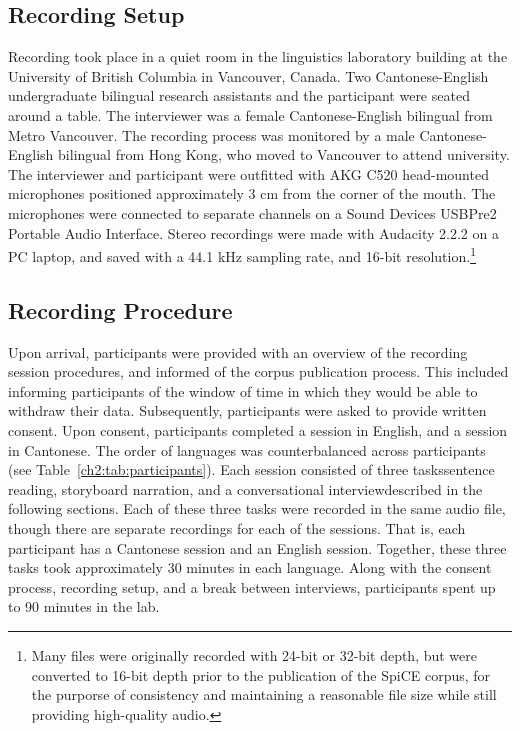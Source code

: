 \subsection{Recording Setup}\label{ch2:subsec:setup}
Recording took place in a quiet room in the linguistics laboratory building at the University of British Columbia in Vancouver, Canada. Two Cantonese-English undergraduate bilingual research assistants and the participant were seated around a table. The interviewer was a female Cantonese-English bilingual from Metro Vancouver. The recording process was monitored by a male Cantonese-English bilingual from Hong Kong, who moved to Vancouver to attend university. The interviewer and participant were outfitted with AKG C520 head-mounted microphones positioned approximately 3 cm from the corner of the mouth. The microphones were connected to separate channels on a Sound Devices USBPre2 Portable Audio Interface. Stereo recordings were made with Audacity 2.2.2 \citep{audacity_2018_audio} on a PC laptop, and saved with a 44.1 kHz sampling rate, and 16-bit resolution.\footnote{Many files were originally recorded with 24-bit or 32-bit depth, but were converted to 16-bit depth prior to the publication of the SpiCE corpus, for the purporse of consistency and maintaining a reasonable file size while still providing high-quality audio.}

\subsection{Recording Procedure}\label{ch2:subsec:procedure}
Upon arrival, participants were provided with an overview of the recording session procedures, and informed of the corpus publication process. This included informing participants of the window of time in which they would be able to withdraw their data. Subsequently, participants were asked to provide written consent. Upon consent, participants completed a session in English, and a session in Cantonese. The order of languages was counterbalanced across participants (see Table~\ref{ch2:tab:participants}). Each session consisted of three tasks\textemdash sentence reading, storyboard narration, and a conversational interview\textemdash described in the following sections. Each of these three tasks were recorded in the same audio file, though there are separate recordings for each of the sessions. That is, each participant has a Cantonese session and an English session. Together, these three tasks took approximately 30 minutes in each language. Along with the consent process, recording setup, and a break between interviews, participants spent up to 90 minutes in the lab. 

